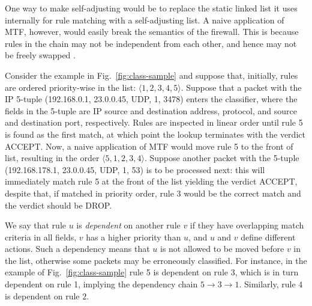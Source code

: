 One way to make \nftables self-adjusting would be to replace the static linked list it uses internally for rule matching with a self-adjusting list. A naive application of MTF, however, would easily break the semantics of the firewall. This is because rules in the chain may not be independent from each other, and hence may not be freely swapped \cite{10.1145/2619239.2626294}.

Consider the example in Fig.~\ref{fig:class-sample} and suppose that, initially, rules are ordered priority-wise in the list: $\langle1, 2, 3, 4, 5\rangle$. Suppose that a packet with the IP 5-tuple (192.168.0.1, 23.0.0.45, UDP, 1, 3478) enters the classifier, where the fields in the 5-tuple are IP source and destination address, protocol, and source and destination port, respectively. Rules are inspected in linear order until rule 5 is found as the first match, at which point the lookup terminates with the verdict ACCEPT. Now, a naive application of MTF would move rule 5 to the front of list, resulting in the order $\langle5, 1, 2, 3, 4\rangle$. Suppose another packet with the 5-tuple (192.168.178.1, 23.0.0.45, UDP, 1, 53) is to be processed next: this will immediately match rule 5 at the front of the list yielding the verdict ACCEPT, despite that, if matched in priority order, rule 3 would be the correct match and the verdict should be DROP. %

We say that rule $u$ is \emph{dependent} on another rule $v$ if they have overlapping match criteria in all fields, $v$ has a higher priority than $u$, and $u$ and $v$ define different actions. Such a dependency means that $u$ is not allowed to be moved before $v$ in the list, otherwise some packets may be erroneously classified. For instance, in the example of Fig.~\ref{fig:class-sample} rule 5 is dependent on rule 3, which is in turn dependent on rule 1, implying the dependency chain $5\to 3\to 1$. Similarly, rule $4$ is dependent on rule $2$. %


